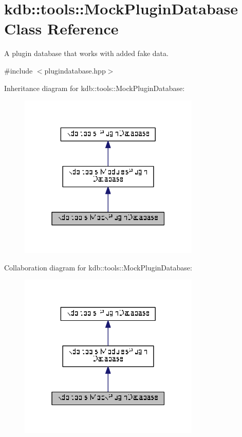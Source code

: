 \hypertarget{classkdb_1_1tools_1_1MockPluginDatabase}{}\section{kdb\+:\+:tools\+:\+:Mock\+Plugin\+Database Class Reference}
\label{classkdb_1_1tools_1_1MockPluginDatabase}


A plugin database that works with added fake data.  




{\ttfamily \#include $<$plugindatabase.\+hpp$>$}



Inheritance diagram for kdb\+:\+:tools\+:\+:Mock\+Plugin\+Database\+:
\nopagebreak
\begin{figure}[H]
\begin{center}
\leavevmode
\includegraphics[width=244pt]{classkdb_1_1tools_1_1MockPluginDatabase__inherit__graph}
\end{center}
\end{figure}


Collaboration diagram for kdb\+:\+:tools\+:\+:Mock\+Plugin\+Database\+:
\nopagebreak
\begin{figure}[H]
\begin{center}
\leavevmode
\includegraphics[width=244pt]{classkdb_1_1tools_1_1MockPluginDatabase__coll__graph}
\end{center}
\end{figure}
